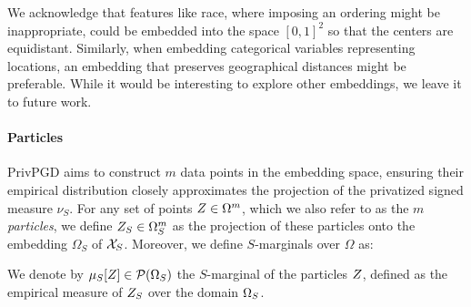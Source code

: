 We acknowledge that features like race, where imposing an ordering might be inappropriate, could be embedded into the space $[0,1]^2$ so that the centers are equidistant. Similarly, when embedding categorical variables representing locations, an embedding that preserves geographical distances might be preferable. While it would be interesting to explore other embeddings, we leave it to future work.



\paragraph{Particles} PrivPGD aims to construct $m$ data points in the embedding space, ensuring their empirical distribution closely approximates the projection of the privatized signed measure $\hat \nu_S $. For any set of points $Z \in \Omega^m$, which we also refer to as the $m$ \textit{particles}, we define $Z_S \in \Omega_S^m$ as the projection of these particles onto the embedding $\Omega_S$ of $\mathcal X_S$.
  Moreover, we define $S$-marginals over $\Omega$ as:
\begin{definition}
    We denote by $\mu_{S}[Z] \in \mathcal P(\Omega_S)$ the $S$-marginal of  the particles $Z$, defined as the empirical measure of $Z_S$ over the domain $\Omega_S$.
\end{definition}

